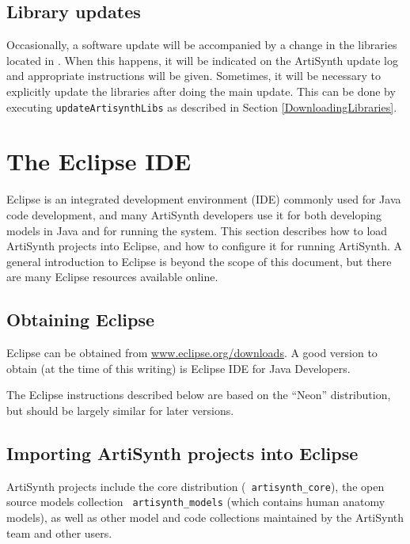 \subsection{Library updates}

Occasionally, a software update will be accompanied by a change in the
libraries located in .  When this
happens, it will be indicated on the ArtiSynth update log and
appropriate instructions will be given. Sometimes, it will be
necessary to explicitly update the libraries after doing the main
update. This can be done by executing {\tt updateArtisynthLibs} as
described in Section \ref{DownloadingLibraries}.

\section{The Eclipse IDE}
\label{EclipseIDE}

Eclipse is an integrated development environment (IDE) commonly used
for Java code development, and many ArtiSynth developers use it for
both developing models in Java and for running the system. This section
describes how to load ArtiSynth projects into Eclipse, and how to
configure it for running ArtiSynth. A general introduction to Eclipse
is beyond the scope of this document, but there are many Eclipse
resources available online.

\subsection{Obtaining Eclipse}

Eclipse can be obtained from
\href{http://www.eclipse.org/downloads}{www.eclipse.org/downloads}.  A
good version to obtain (at the time of this writing) is {\sf Eclipse
IDE for Java Developers}.

\begin{sideblock}
The Eclipse instructions described below are based on the ``Neon''
distribution, but should be largely similar for later versions.
\end{sideblock}

\subsection{Importing ArtiSynth projects into Eclipse}

ArtiSynth projects include the core distribution ({\tt
artisynth\_core}), the open source models collection {\tt
artisynth\_models} (which contains human anatomy models), as well as
other model and code collections maintained by the ArtiSynth team and
other users.

